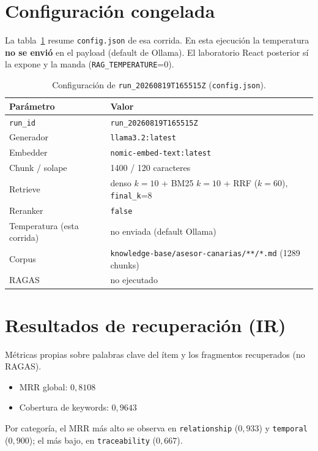 \section{Configuración congelada}
La tabla~\ref{tab:eval-config} resume \texttt{config.json} de esa corrida. En esta ejecución la temperatura \textbf{no se envió} en el payload (default de Ollama). El laboratorio React posterior sí la expone y la manda (\texttt{RAG\_TEMPERATURE}=0).

\begin{table}[htbp]
\centering
\caption{Configuración de \texttt{run\_20260819T165515Z} (\texttt{config.json}).}
\label{tab:eval-config}
\begin{tabular}{ll}
\toprule
\textbf{Parámetro} & \textbf{Valor} \\
\midrule
\texttt{run\_id} & \texttt{run\_20260819T165515Z} \\
Generador & \texttt{llama3.2:latest} \\
Embedder & \texttt{nomic-embed-text:latest} \\
Chunk / solape & 1400 / 120 caracteres \\
Retrieve & denso $k{=}10$ + BM25 $k{=}10$ + RRF ($k{=}60$), \texttt{final\_k}=8 \\
Reranker & \texttt{false} \\
Temperatura (esta corrida) & no enviada (default Ollama) \\
Corpus & \texttt{knowledge-base/asesor-canarias/**/*.md} (1289 chunks) \\
RAGAS & no ejecutado \\
\bottomrule
\end{tabular}
\end{table}

\section{Resultados de recuperación (IR)}
Métricas propias sobre palabras clave del ítem y los fragmentos recuperados (no RAGAS).

\begin{itemize}
  \item MRR global: $0{,}8108$
  \item Cobertura de keywords: $0{,}9643$
\end{itemize}

Por categoría, el MRR más alto se observa en \texttt{relationship} ($0{,}933$) y \texttt{temporal} ($0{,}900$); el más bajo, en \texttt{traceability} ($0{,}667$).

